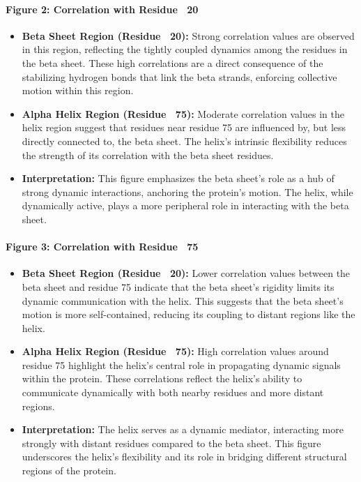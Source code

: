 \documentclass[English, Lau, oneside]{sapthesis}
\begin{document}
\begin{itemize}
\paragraph{Figure 2: Correlation with Residue ~20}
\begin{itemize}
    \item \textbf{Beta Sheet Region (Residue ~20):} Strong correlation values are observed in this region, reflecting the tightly coupled dynamics among the residues in the beta sheet. These high correlations are a direct consequence of the stabilizing hydrogen bonds that link the beta strands, enforcing collective motion within this region.
    \item \textbf{Alpha Helix Region (Residue ~75):} Moderate correlation values in the helix region suggest that residues near residue 75 are influenced by, but less directly connected to, the beta sheet. The helix's intrinsic flexibility reduces the strength of its correlation with the beta sheet residues.
    \item \textbf{Interpretation:} This figure emphasizes the beta sheet's role as a hub of strong dynamic interactions, anchoring the protein’s motion. The helix, while dynamically active, plays a more peripheral role in interacting with the beta sheet.
\end{itemize}

\paragraph{Figure 3: Correlation with Residue ~75}
\begin{itemize}
    \item \textbf{Beta Sheet Region (Residue ~20):} Lower correlation values between the beta sheet and residue 75 indicate that the beta sheet's rigidity limits its dynamic communication with the helix. This suggests that the beta sheet’s motion is more self-contained, reducing its coupling to distant regions like the helix.
    \item \textbf{Alpha Helix Region (Residue ~75):} High correlation values around residue 75 highlight the helix's central role in propagating dynamic signals within the protein. These correlations reflect the helix’s ability to communicate dynamically with both nearby residues and more distant regions.
    \item \textbf{Interpretation:} The helix serves as a dynamic mediator, interacting more strongly with distant residues compared to the beta sheet. This figure underscores the helix’s flexibility and its role in bridging different structural regions of the protein.
\end{itemize}


\end{itemize}
\end{document}
